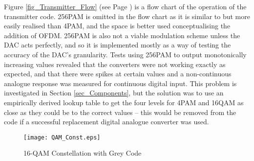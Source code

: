 \documentclass[../main.tex]{subfiles}
\begin{document}
Figure \ref{fig_Transmitter_Flow} (see Page \pageref{fig_Transmitter_Flow}) is a flow chart of the operation of the transmitter code.
256PAM is omitted in the flow chart as it is similar to but more easily realised than 4PAM, and the space is better used conceptualising the addition of OFDM.
256PAM is also not a viable modulation scheme unless the DAC acts perfectly, and so it is implemented mostly as a way of testing the accuracy of the DAC's granularity.
Tests using 256PAM to output monotonically increasing values revealed that the converters were not working exactly as expected, and that there were spikes at certain values and a non-continuous analogue response was measured for continuous digital input.
This problem is investigated in Section \ref{sec_Components}, but the solution was to use an empirically derived lookup table to get the four levels for 4PAM and 16QAM as close as they could be to the correct values -- this would be removed from the code if a successful replacement digital analogue converter was used.\\

\begin{figure}[ht]
 	\centering
 	\texttt{[image: QAM\_Const.eps]}
 	\caption{16-QAM Constellation with Grey Code}
 	\label{fig_QAM Constellation}
\end{figure}
\end{document}
